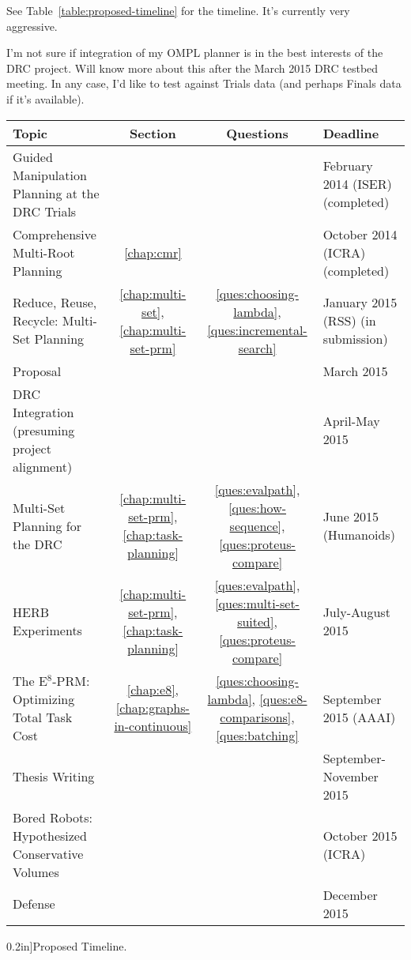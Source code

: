 See Table~\ref{table:proposed-timeline} for the timeline.
It's currently very aggressive.

I'm not sure if integration of my OMPL planner
is in the best interests of the DRC project.
Will know more about this after the March 2015 DRC testbed meeting.
In any case, I'd like to test against Trials data
(and perhaps Finals data if it's available).

\begin{table*}
   \begin{widepage}
   \centering
   {
   \renewcommand{\arraystretch}{1.5}
   \begin{tabular}{lccl}
   \toprule
   {\bf Topic} & {\bf Section} & {\bf Questions} & {\bf Deadline} \\
   \midrule
   Guided Manipulation Planning at the DRC Trials \citep{dellin2014drc}
      & %
      &
      & February 2014 (ISER) (completed) \\
   Comprehensive Multi-Root Planning \citep{dellin2015cmr}
      & \ref{chap:cmr}
      &
      & October 2014 (ICRA) (completed) \\
   Reduce, Reuse, Recycle: Multi-Set Planning \citep{dellin2015multiset}
      & \ref{chap:multi-set}, \ref{chap:multi-set-prm}
      & \ref{ques:choosing-lambda}, \ref{ques:incremental-search}
      & January 2015 (RSS) (in submission) \\
   \midrule
   Proposal
      & & & March 2015 \\
   DRC Integration (presuming project alignment)
      & & & April-May 2015 \\
   Multi-Set Planning for the DRC
      & \ref{chap:multi-set-prm}, \ref{chap:task-planning}
      & \ref{ques:evalpath}, \ref{ques:how-sequence},
        \ref{ques:proteus-compare}
      & June 2015 (Humanoids) \\
   HERB Experiments
      & \ref{chap:multi-set-prm}, \ref{chap:task-planning}
      & \ref{ques:evalpath}, \ref{ques:multi-set-suited},
        \ref{ques:proteus-compare}
      & July-August 2015 \\
   The E$^8$-PRM: Optimizing Total Task Cost
      & \ref{chap:e8}, \ref{chap:graphs-in-continuous}
      & \ref{ques:choosing-lambda}, \ref{ques:e8-comparisons},
        \ref{ques:batching}
      & September 2015 (AAAI) \\
   Thesis Writing
      & & & September-November 2015 \\
   Bored Robots: Hypothesized Conservative Volumes
      & & & October 2015 (ICRA) \\
   Defense
      & & & December 2015 \\
   \bottomrule
   \end{tabular}
   } %
   \end{widepage}
   \caption[][0.2in]{Proposed Timeline. }
   \label{table:proposed-timeline}
\end{table*}

